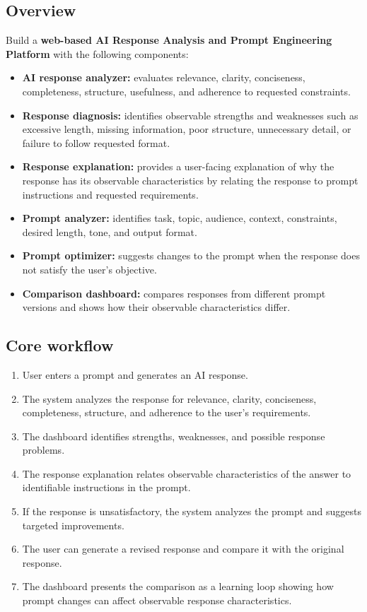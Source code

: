 \documentclass[11pt,a4paper]{article}
\begin{document}
\subsection{Overview}

Build a \textbf{web-based AI Response Analysis and Prompt Engineering
Platform} with the following components:

\begin{itemize}[leftmargin=0.7cm]
    \item \textbf{AI response analyzer:} evaluates relevance, clarity,
    conciseness, completeness, structure, usefulness, and adherence to
    requested constraints.
    \item \textbf{Response diagnosis:} identifies observable strengths and
    weaknesses such as excessive length, missing information, poor structure,
    unnecessary detail, or failure to follow requested format.
    \item \textbf{Response explanation:} provides a user-facing explanation
    of why the response has its observable characteristics by relating the
    response to prompt instructions and requested requirements.
    \item \textbf{Prompt analyzer:} identifies task, topic, audience, context,
    constraints, desired length, tone, and output format.
    \item \textbf{Prompt optimizer:} suggests changes to the prompt when the
    response does not satisfy the user's objective.
    \item \textbf{Comparison dashboard:} compares responses from different
    prompt versions and shows how their observable characteristics differ.
\end{itemize}

\subsection{Core workflow}

\begin{enumerate}[leftmargin=0.7cm]
    \item User enters a prompt and generates an AI response.
    \item The system analyzes the response for relevance, clarity,
    conciseness, completeness, structure, and adherence to the user's
    requirements.
    \item The dashboard identifies strengths, weaknesses, and possible
    response problems.
    \item The response explanation relates observable characteristics of the
    answer to identifiable instructions in the prompt.
    \item If the response is unsatisfactory, the system analyzes the prompt
    and suggests targeted improvements.
    \item The user can generate a revised response and compare it with the
    original response.
    \item The dashboard presents the comparison as a learning loop showing
    how prompt changes can affect observable response characteristics.
\end{enumerate}
\end{document}
